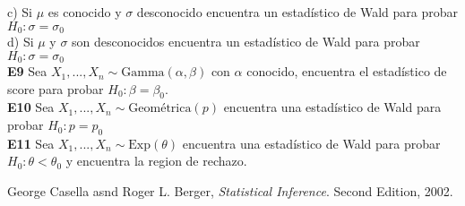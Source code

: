 \documentclass[11pt,spanish]{article}
\begin{document}
\hspace*{6mm} c) Si $\mu$ es conocido y $\sigma$ desconocido encuentra un estadístico de Wald para probar $H_0:\sigma=\sigma_0$
\\
\hspace*{6mm} d) Si $\mu$ y $\sigma$ son desconocidos encuentra un estadístico de Wald para probar $H_0:\sigma=\sigma_0$\\
\textbf{E9} Sea $X_1,...,X_n\sim \text{Gamma}(\alpha,\beta)$ con $\alpha$ conocido, encuentra el estadístico de score para probar $H_0:\beta=\beta_0$. \\
\textbf{E10} Sea $X_1,...,X_n\sim \text{Geométrica}(p)$ encuentra una estadístico de Wald para probar  $H_0:p=p_0$\\
\textbf{E11} Sea $X_1,...,X_n\sim \text{Exp}(\theta)$ encuentra una estadístico de Wald para probar  $H_0:\theta<\theta_0$ y encuentra la region de rechazo.
\begin{thebibliography}{9}
George Casella asnd Roger L. Berger, \textit{Statistical Inference}. 
Second Edition, 2002.
\end{thebibliography}
\end{document}
